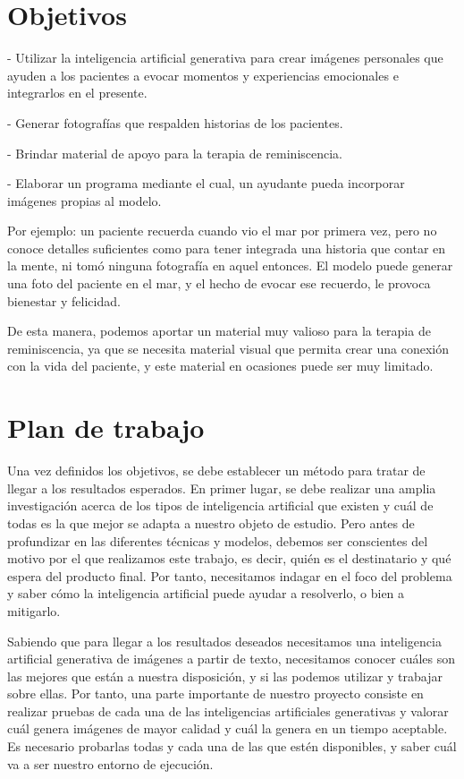 \section{Objetivos}

- Utilizar la inteligencia artificial generativa para crear imágenes personales que ayuden a los pacientes a evocar momentos y experiencias emocionales e integrarlos en el presente.

- Generar fotografías que respalden historias de los pacientes.

- Brindar material de apoyo para la terapia de reminiscencia.

- Elaborar un programa mediante el cual, un ayudante pueda incorporar imágenes propias al modelo.

Por ejemplo: un paciente recuerda cuando vio el mar por primera vez, pero no conoce detalles suficientes como para tener integrada una historia que contar en la mente, ni tomó ninguna fotografía en aquel entonces. El modelo puede generar una foto del paciente en el mar, y el hecho de evocar ese recuerdo, le provoca bienestar y felicidad.

De esta manera, podemos aportar un material muy valioso para la terapia de reminiscencia, ya que se necesita material visual que permita crear una conexión con la vida del paciente, y este material en ocasiones puede ser muy limitado.

\section{Plan de trabajo}

Una vez definidos los objetivos, se debe establecer un método para tratar de llegar a los resultados esperados. En primer lugar, se debe realizar una amplia investigación acerca de los tipos de inteligencia artificial que existen y cuál de todas es la que mejor se adapta a nuestro objeto de estudio. Pero antes de profundizar en las diferentes técnicas y modelos, debemos ser conscientes del motivo por el que realizamos este trabajo, es decir, quién es el destinatario y qué espera del producto final. Por tanto, necesitamos indagar en el foco del problema y saber cómo la inteligencia artificial puede ayudar a resolverlo, o bien a mitigarlo. 

Sabiendo que para llegar a los resultados deseados necesitamos una inteligencia artificial generativa de imágenes a partir de texto, necesitamos conocer cuáles son las mejores que están a nuestra disposición, y si las podemos utilizar y trabajar sobre ellas. Por tanto, una parte importante de nuestro proyecto consiste en realizar pruebas de cada una de las inteligencias artificiales generativas y valorar cuál genera imágenes de mayor calidad y cuál la genera en un tiempo aceptable. Es necesario probarlas todas y cada una de las que estén disponibles, y saber cuál va a ser nuestro entorno de ejecución.

